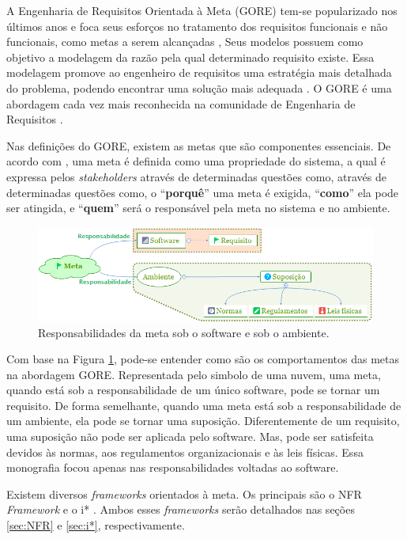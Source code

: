 A Engenharia de Requisitos Orientada à Meta (GORE) tem-se popularizado nos últimos anos e foca seus esforços no tratamento dos requisitos funcionais e não funcionais, como metas a serem alcançadas \cite{van2001goal}, Seus modelos possuem como objetivo a modelagem da razão pela qual determinado requisito existe. Essa modelagem promove ao engenheiro de requisitos uma estratégia mais detalhada do problema, podendo encontrar uma solução mais adequada \cite{van2001goal}\cite{chung2012non}. O GORE é uma abordagem cada vez mais reconhecida na comunidade de Engenharia de Requisitos \cite{van2001goal}.

Nas definições do GORE, existem as metas que são componentes essenciais. De acordo com \cite{van2001goal}, uma meta é definida como uma propriedade do sistema, a qual é expressa pelos \textit{stakeholders} através de determinadas questões como, através de determinadas questões como, o “\textbf{porquê}” uma meta é exigida, “\textbf{como}” ela pode ser atingida, e “\textbf{quem}” será o responsável pela meta no sistema e no ambiente.

\begin{figure}[h!]
	\centering
	\includegraphics[keepaspectratio=true,scale=0.8]{figuras/GORE.png}
	\caption{Responsabilidades da meta sob o software e sob o ambiente.}
	\label{Gore}
\end{figure}


\pagebreak

 Com base na Figura \ref{Gore}, pode-se entender como são os comportamentos das metas na abordagem GORE. Representada pelo simbolo de uma nuvem, uma meta, quando está sob a responsabilidade de um único software, pode se tornar um requisito. De forma semelhante, quando uma meta está sob a responsabilidade de um ambiente, ela pode se tornar uma suposição. Diferentemente de um requisito, uma suposição não pode ser aplicada pelo software. Mas, pode ser satisfeita devidos às normas, aos regulamentos organizacionais e às leis físicas\cite{van2001goal}. Essa monografia focou apenas nas responsabilidades voltadas ao software.


Existem diversos \textit{frameworks} orientados à meta. Os principais  são o NFR \textit{Framework} \cite{chung2012non} e o i* \cite{istarwiki20}. Ambos esses \textit{frameworks} serão detalhados nas seções \ref{sec:NFR} e \ref{sec:i*}, respectivamente.

